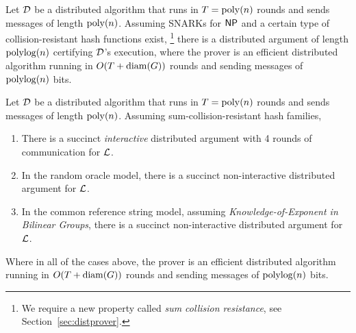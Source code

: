 Let $\mathcal{D}$ be a distributed algorithm that runs in $T = \operatorname{poly}(n)$ rounds
    and sends messages of length $\operatorname{poly}(n)$.
    Assuming SNARKs for ${\mathsf{NP}}$ %
    and %
    a certain type of collision-resistant hash functions exist,%
    \footnote{We require a new property called \emph{sum collision resistance}, see Section~\ref{sec:distprover}.}
    there is a distributed argument of length $\operatorname{polylog}(n)$
    certifying $\mathcal{D}$'s execution, where the prover is an efficient distributed algorithm
    running in $O(T + \operatorname{diam}(G))$ rounds and sending messages of $\operatorname{polylog}(n)$ bits.
\begin{theorem}
    Let $\mathcal{D}$ be a distributed algorithm that runs in $T = \operatorname{poly}(n)$ rounds and sends messages of length $\operatorname{poly}(n)$. Assuming sum-collision-resistant hash families,
    \begin{enumerate}
        \item There is a succinct \emph{interactive} distributed argument with 4 rounds of communication for $\mathcal{L}$. 
        \item In the random oracle model, there is a succinct non-interactive distributed argument for $\mathcal{L}$.
        \item In the common reference string model, assuming \emph{Knowledge-of-Exponent in Bilinear Groups}, there is a succinct non-interactive distributed argument for $\mathcal{L}$. 
    \end{enumerate}
    Where in all of the cases above, the prover is an efficient distributed algorithm
    running in $O(T + \operatorname{diam}(G))$ rounds and sending messages of $\operatorname{polylog}(n)$ bits.
\end{theorem}